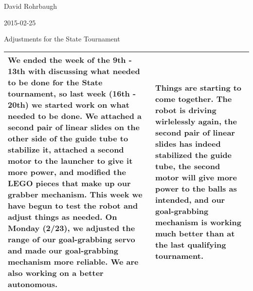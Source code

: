 David Rohrbaugh

2015-02-25

Adjustments for the State Tournament

\begin{tabular}{|p{5cm}|p{5cm}|}
 \hline
 We ended the week of the 9th - 13th with discussing what needed to be done for the State tournament, so last week (16th - 20th) we started work on what needed to be done. We attached a second pair of linear slides on the other side of the guide tube to stabilize it, attached a second motor to the launcher to give it more power, and modified the LEGO pieces that make up our grabber mechanism. This week we have begun to test the robot and adjust things as needed. On Monday (2/23), we adjusted the range of our goal-grabbing servo and made our goal-grabbing mechanism more reliable. We are also working on a better autonomous.
 &
 Things are starting to come together. The robot is driving wirlelessly again, the second pair of linear slides has indeed stabilized the guide tube, the second motor will give more power to the balls as intended, and our goal-grabbing mechanism is working much better than at the last qualifying tournament.
 \\
 \hline
\end{tabular}

\medskip

\begin{center}
\end{center}
